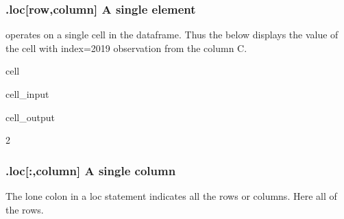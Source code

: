 \documentclass[letterpaper,10pt,english]{jupyterBook}
\begin{document}
\subsubsection{.loc{[}row,column{]} A single element}
\label{\detokenize{content/04_PythonEssentials/PythonPandasDataframes:loc-row-column-a-single-element}}
\sphinxAtStartPar
{} operates on a single cell in the dataframe.  Thus the below displays the value of the cell with index=2019 observation from the  column C.

\begin{sphinxuseclass}{cell}\begin{sphinxVerbatimInput}

\begin{sphinxuseclass}{cell_input}
\begin{sphinxVerbatim}[commandchars=\\\{\}]
\PYG{p}{[}\PYG{p}{]}
\end{sphinxVerbatim}

\end{sphinxuseclass}\end{sphinxVerbatimInput}
\begin{sphinxVerbatimOutput}

\begin{sphinxuseclass}{cell_output}
\begin{sphinxVerbatim}[commandchars=\\\{\}]
2
\end{sphinxVerbatim}

\end{sphinxuseclass}\end{sphinxVerbatimOutput}

\end{sphinxuseclass}

\subsubsection{.loc{[}:,column{]} A single column}
\label{\detokenize{content/04_PythonEssentials/PythonPandasDataframes:loc-column-a-single-column}}
\sphinxAtStartPar
The lone colon in a loc statement indicates all the rows or columns.  Here all of the rows.
\end{document}
